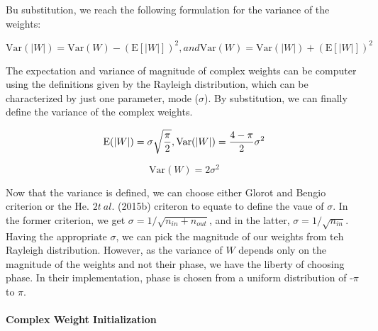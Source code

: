  Bu substitution, we reach the following formulation for the variance of the weights:
 
 \begin{equation}\label{varw2}
 \mathrm{Var}(|W|) = \mathrm{Var}(W)-(\mathrm{E}[|W|])^2 , and  
 \mathrm{Var}(W) = \mathrm{Var}(|W|) + (\mathrm{E}[|W|])^2
 \end{equation}
  
 The expectation and variance of magnitude of complex weights can be computer using the definitions given by the Rayleigh distribution, which can be characterized by just one parameter, mode ($\sigma$). By substitution, we can finally define the variance of the complex weights.
 
 \begin{equation}\label{ray}
 \mathrm{E}(|W|) = \sigma\sqrt{\frac{\pi}{2}},\\  
 \mathrm{Var}(|W|) = \frac{4-\pi}{2}\sigma^{2}
 \end{equation}
 
 
 \begin{equation}\label{ray}
 \mathrm{Var}(W) = 2\sigma^2
 \end{equation}
 
 Now that the variance is defined,  we can choose either Glorot and Bengio criterion or the He. $2t \ al.$ (2015b) criteron to equate to define the vaue of $\sigma$. In the former criterion, we get $\sigma = 1/\sqrt{n_{in}+n_{out}}$, and in the latter, $\sigma = 1/\sqrt{n_{in}}$. Having the appropriate $\sigma$, we can pick the magnitude of our weights from teh Rayleigh distribution. However, as the variance of $W$ depends only on the magnitude of the weights and not their phase,  we have the liberty of choosing phase. In their implementation, phase is chosen from a uniform distribution of -$\pi$ to $\pi$.
 
 
 
 \paragraph{Complex Weight Initialization}
 
